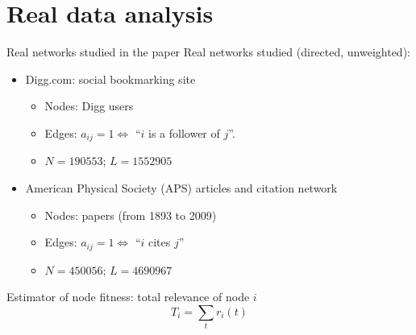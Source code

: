\section{Real data analysis}

\begin{frame}{Real networks studied in the paper}
    Real networks studied (directed, unweighted):
    \begin{itemize}
        \item \alert{Digg.com}: social bookmarking site
        \begin{itemize}
            \item Nodes: Digg users
            \item Edges: $a_{ij}=1 \Leftrightarrow$ ``$i$ is a follower of $j$''.
            \item $N = \num{190553}$; $L = \num{1552905}$
        \end{itemize}

        \item \alert{American Physical Society} (APS) articles and citation network
        \begin{itemize}
            \item Nodes: papers (from 1893 to 2009)
            \item Edges: $a_{ij}=1 \Leftrightarrow$ ``$i$ cites $j$''
            \item $N = \num{450056}$; $L = \num{4690967}$
        \end{itemize}
    \end{itemize}
    \vspace{1em}
    Estimator of node fitness: \alert{total relevance} of node $i$
    \[
        T_i = \sum_t r_i(t)
    \]
\end{frame}


